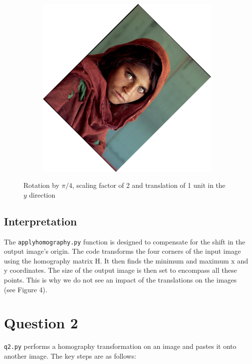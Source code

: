 \documentclass{article}
\begin{document}
\begin{figure}[H]
\begin{subfigure}{.3\textwidth}
    \end{subfigure}
    \begin{subfigure}{.3\textwidth}
        \centering
        \includegraphics[scale=0.04]{q1/output/similar_2_2_2.jpg}
    \end{subfigure}
    \label{fig:4}
    \caption{Rotation by \(\pi/4\), scaling factor of 2 and translation of 1 unit in the \(y\) direction}
\end{figure}

\subsection{Interpretation}
The \texttt{applyhomography.py} function is designed to compensate for the shift in the output image's origin. The code transforms the four corners of the input image using the homography matrix H. 
It then finds the minimum and maximum x and y coordinates. The size of the output image is then set to encompass all these points. 
This is why we do not see an impact of the translations on the images (see Figure 4). 

\section{Question 2}
\texttt{q2.py} performs a homography transformation on an image and pastes it onto another image. The key steps are as follows:
\end{document}
